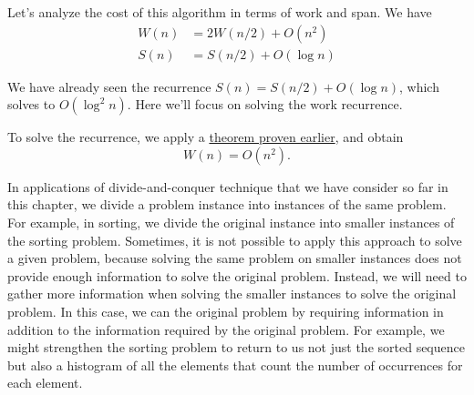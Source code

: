 \begin{cluster}
\label{grp:grm:design::dc::cost}

\begin{gram}
\label{grm:design::dc::cost}
Let's analyze the cost of this algorithm in terms of work and
span.  
We have
\[ \begin{align*}
  W(n) & = 2W(n/2) + O(n^2)\\
  S(n) & =  S(n/2) + O(\log n)
\end{align*} \]

We have already seen the recurrence $S(n) = S(n/2) + O(\log n)$, which solves
to $O(\log^2 n).$  Here we'll focus on solving the work recurrence.  


To solve the recurrence, we apply a 
\href{thm:analysis::recurrences::linear-plus}{theorem  proven earlier},
and obtain 
\[
W(n) = O(n^2).
\]

\end{gram}
\end{cluster}

\begin{cluster}
\label{grp:grm:design::dc::strengthening}

\begin{gram}[Strengthening]
\label{grm:design::dc::strengthening}
In applications of divide-and-conquer technique that we have consider so far in this chapter, we divide a problem instance into instances of the same problem.
For example, in sorting, we divide the original instance into  smaller instances of the sorting problem.
Sometimes, it is not possible to apply this approach to solve a given problem, because solving the same problem on smaller instances does not provide enough information to solve the original problem.
Instead, we will need to gather more information
when solving the smaller instances to solve the original problem. 
In this case, we can  the original problem by requiring information in addition to the information required by the original problem.
For example, we might strengthen the sorting problem to return to us not just the sorted sequence but also a histogram of all the elements that count the number of occurrences for each element.

\end{gram}
\end{cluster}

